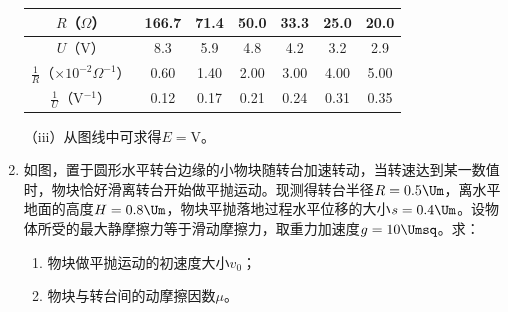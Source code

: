 \documentclass[\gkver]{gaokaozhenti}
\begin{document}
\begin{enumerate}
\begin{center}
\begin{tabular}{|c|c|c|c|c|c|c|}
\hline
$R$（$\Omega$） & 166.7 & 71.4 & 50.0 & 33.3 & 25.0 & 20.0 \\
\hline
$U$（V） & 8.3 & 5.9 & 4.8 & 4.2 & 3.2 & 2.9 \\
\hline
$\frac{1}{R}$（$\times10^{-2}\Omega^{-1}$） & 0.60 & 1.40 & 2.00 & 3.00 & 4.00 & 5.00 \\
\hline
$\frac{1}{U}$（V$^{-1}$） & 0.12 & 0.17 & 0.21 & 0.24 & 0.31 & 0.35 \\
\hline
\end{tabular}
\end{center}
（iii）从图线中可求得$E=$\underline{\hspace{1.6cm}}V。

\item
如图，置于圆形水平转台边缘的小物块随转台加速转动，当转速达到某一数值时，物块恰好滑离转台开始做平抛运动。现测得转台半径$R=0.5\Um$，离水平地面的高度$H=0.8\Um$，物块平抛落地过程水平位移的大小$s=0.4\Um$。设物体所受的最大静摩擦力等于滑动摩擦力，取重力加速度$g=10\Umsq$。求：
\begin{enumerate}
	\item
	物块做平抛运动的初速度大小$v_{0}$；
	\item
	物块与转台间的动摩擦因数$\mu$。
\end{enumerate}
\end{enumerate}
\end{document}
